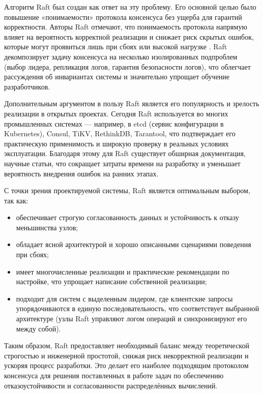 Алгоритм Raft был создан как ответ на эту проблему. Его основной целью было
повышение «понимаемости» протокола консенсуса без ущерба для гарантий
корректности. Авторы Raft отмечают, что понимаемость протокола напрямую влияет
на вероятность корректной реализации и снижает риск скрытых ошибок, которые
могут проявиться лишь при сбоях или высокой нагрузке \cite{ongario2014}. Raft
декомпозирует задачу консенсуса на несколько изолированных подпроблем (выбор
лидера, репликация логов, гарантия безопасности логов), что облегчает
рассуждения об инвариантах системы и значительно упрощает обучение
разработчиков.

Дополнительным аргументом в пользу Raft является его популярность и зрелость
реализации в открытых проектах. Сегодня Raft используется во многих
промышленных системах — например, в etcd (сервис конфигурации в Kubernetes),
Consul, TiKV, RethinkDB, Tarantool, что подтверждает его практическую
применимость и широкую проверку в реальных условиях эксплуатации. Благодаря
этому для Raft существует обширная документация, научные статьи, что сокращает
затраты времени на разработку и уменьшает вероятность внедрения ошибок на
ранних этапах.

С точки зрения проектируемой системы, Raft является оптимальным выбором,
так как:
\begin{itemize}
    \item обеспечивает строгую согласованность данных и устойчивость
    к отказу меньшинства узлов;
    \item обладает ясной архитектурой и хорошо описанными сценариями
    поведения при сбоях;
    \item имеет многочисленные реализации и практические рекомендации
    по настройке, что упрощает написание собственной реализации;
    \item подходит для систем с выделенным лидером, где клиентские
    запросы упорядочиваются в единую последовательность,
    что соответствует выбранной архитектуре (узлы Raft управляют
    логом операций и синхронизируют его между собой).
\end{itemize}

Таким образом, Raft предоставляет необходимый баланс между теоретической
строгостью и инженерной простотой, снижая риск некорректной реализации и
ускоряя процесс разработки. Это делает его наиболее подходящим протоколом
консенсуса для решения поставленных в работе задач по обеспечению
отказоустойчивости и согласованности распределённых вычислений.
